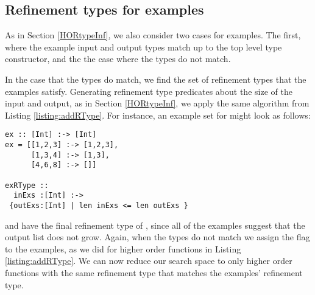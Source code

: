 \subsection{Refinement types for examples}
As in Section \ref{HORtypeInf}, we also consider two cases for examples. The first, where the example input and output types match up to the top level type constructor, and the the case where the types do not match.

In the case that the types do match, we find the set of refinement types that the examples satisfy. Generating refinement type predicates about the size of the input and output, as in Section \ref{HORtypeInf}, we apply the same algorithm from Listing \ref{listing:addRType}. 
For instance, an example set for  might look as follows:

\begin{lstlisting}[caption=Refinement type inference for examples,label=exRTypeGen]
ex :: [Int] :-> [Int]
ex = [[1,2,3] :-> [1,2,3],
      [1,3,4] :-> [1,3],
      [4,6,8] :-> []]
       
exRType ::
  inExs :[Int] :-> 
 {outExs:[Int] | len inExs <= len outExs }
\end{lstlisting}

\noindent and have the final refinement type of , since all of the examples suggest that the output list does not grow. 
Again, when the types do not match we assign the  flag to the examples, as we did for higher order functions in Listing \ref{listing:addRType}.
We can now reduce our search space to only higher order functions with the same refinement type that matches the examples' refinement type. 

